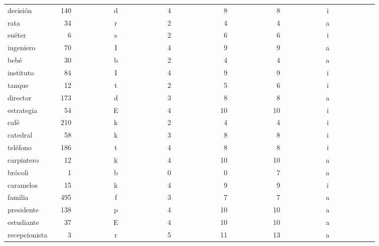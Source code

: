 \begin{longtable}{|l|c|c|c|c|c|c|}
decisi\'{o}n~~~~~&140~~~~~~~~~~&d~~~~~~~~~~~~&4~~~~~~~~~~~~&~8~~~~~~~~~~~&~8~~~~~~~~~~~&i~~~~~~~~~~~~\\ 
rata~~~~~~~~~&~34~~~~~~~~~~&r~~~~~~~~~~~~&2~~~~~~~~~~~~&~4~~~~~~~~~~~&~4~~~~~~~~~~~&a~~~~~~~~~~~~\\ 
su\'{e}ter~~~~~~~&~~6~~~~~~~~~~&s~~~~~~~~~~~~&2~~~~~~~~~~~~&~6~~~~~~~~~~~&~6~~~~~~~~~~~&i~~~~~~~~~~~~\\ 
ingeniero~~~~&~70~~~~~~~~~~&I~~~~~~~~~~~~&4~~~~~~~~~~~~&~9~~~~~~~~~~~&~9~~~~~~~~~~~&a~~~~~~~~~~~~\\ 
beb\'{e}~~~~~~~~~&~30~~~~~~~~~~&b~~~~~~~~~~~~&2~~~~~~~~~~~~&~4~~~~~~~~~~~&~4~~~~~~~~~~~&a~~~~~~~~~~~~\\ 
instituto~~~~&~84~~~~~~~~~~&I~~~~~~~~~~~~&4~~~~~~~~~~~~&~9~~~~~~~~~~~&~9~~~~~~~~~~~&i~~~~~~~~~~~~\\ 
tanque~~~~~~~&~12~~~~~~~~~~&t~~~~~~~~~~~~&2~~~~~~~~~~~~&~5~~~~~~~~~~~&~6~~~~~~~~~~~&i~~~~~~~~~~~~\\ 
director~~~~~&173~~~~~~~~~~&d~~~~~~~~~~~~&3~~~~~~~~~~~~&~8~~~~~~~~~~~&~8~~~~~~~~~~~&a~~~~~~~~~~~~\\ 
estrategia~~~&~54~~~~~~~~~~&E~~~~~~~~~~~~&4~~~~~~~~~~~~&10~~~~~~~~~~~&10~~~~~~~~~~~&i~~~~~~~~~~~~\\ 
caf\'{e}~~~~~~~~~&210~~~~~~~~~~&k~~~~~~~~~~~~&2~~~~~~~~~~~~&~4~~~~~~~~~~~&~4~~~~~~~~~~~&i~~~~~~~~~~~~\\ 
catedral~~~~~&~58~~~~~~~~~~&k~~~~~~~~~~~~&3~~~~~~~~~~~~&~8~~~~~~~~~~~&~8~~~~~~~~~~~&i~~~~~~~~~~~~\\ 
tel\'{e}fono~~~~~&186~~~~~~~~~~&t~~~~~~~~~~~~&4~~~~~~~~~~~~&~8~~~~~~~~~~~&~8~~~~~~~~~~~&i~~~~~~~~~~~~\\ 
carpintero~~~&~12~~~~~~~~~~&k~~~~~~~~~~~~&4~~~~~~~~~~~~&10~~~~~~~~~~~&10~~~~~~~~~~~&a~~~~~~~~~~~~\\ 
brócoli~~~~~~&~~1~~~~~~~~~~&b~~~~~~~~~~~~&0~~~~~~~~~~~~&~0~~~~~~~~~~~&~7~~~~~~~~~~~&a~~~~~~~~~~~~\\ 
caramelos~~~~&~15~~~~~~~~~~&k~~~~~~~~~~~~&4~~~~~~~~~~~~&~9~~~~~~~~~~~&~9~~~~~~~~~~~&i~~~~~~~~~~~~\\ 
familia~~~~~~&495~~~~~~~~~~&f~~~~~~~~~~~~&3~~~~~~~~~~~~&~7~~~~~~~~~~~&~7~~~~~~~~~~~&a~~~~~~~~~~~~\\ 
presidente~~~&138~~~~~~~~~~&p~~~~~~~~~~~~&4~~~~~~~~~~~~&10~~~~~~~~~~~&10~~~~~~~~~~~&a~~~~~~~~~~~~\\ 
estudiante~~~&~37~~~~~~~~~~&E~~~~~~~~~~~~&4~~~~~~~~~~~~&10~~~~~~~~~~~&10~~~~~~~~~~~&a~~~~~~~~~~~~\\ 
recepcionista&~~3~~~~~~~~~~&r~~~~~~~~~~~~&5~~~~~~~~~~~~&11~~~~~~~~~~~&13~~~~~~~~~~~&a~~~~~~~~~~~~\\ 

\end{longtable}
